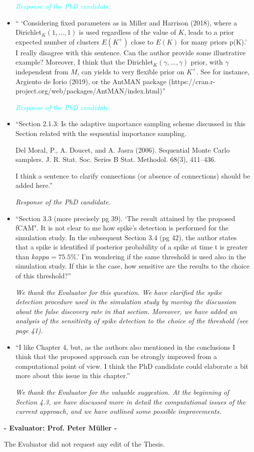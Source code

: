 \documentclass[11pt]{letter}
\begin{document}
\begin{itemize}
{\em 
	\textcolor{cyan}{Response of the PhD candidate.}
}
\vskip3mm

%
\item `` `Considering fixed parameters as in Miller and Harrison (2018), where a Dirichlet$_K(1,\dots, 1)$ is used regardless of the value of $K$, leads to a prior expected number of clusters $E(K^+)$ close to $E(K)$ for many priors p(K).'\\
I really disagree with this sentence. Can the author provide some illustrative example? Moreover, I think that the Dirichlet$_K(\gamma,\dots, \gamma)$ prior, with $\gamma$ independent from $M$, can yields to very flexible prior on $K^+$. See for instance, Argiento de Iorio (2019), or the AntMAN package (https://cran.r-
project.org/web/packages/AntMAN/index.html)''\vskip1mm

{\em 
	\textcolor{cyan}{Response of the PhD candidate.}
}
\vskip3mm

%
\item ``Section 2.1.3:
Is the adaptive importance sampling scheme discussed in this Section related with the sequential importance
sampling.

Del Moral, P., A. Doucet, and A. Jasra (2006). Sequential Monte Carlo samplers. J. R. Stat. Soc. Series B Stat. Methodol. 68(3), 411–436.

I think a sentence to clarify connections (or absence of connections) should be added here.''\vskip1mm

{\em 
	Response of the PhD candidate.
}
\vskip3mm

%
\item ``Section 3.3 (more precisely pg 39). `The result attained by the proposed fCAM".
It is not clear to me how spike's detection is performed for the simulation study. In the subsequent Section 3.4 (pg 42), the author states that a spike is identified if posterior probability of a spike at time t is greater than $kappa=75.5\%$.'
I'm wondering if the same threshold is used also in the simulation study. If this is the case, how sensitive are the results to the choice of this threshold?''\vskip1mm

{\em 
	We thank the Evaluator for this question. We have clarified the spike detection procedure used in the simulation study by moving the discussion about the false discovery rate in that section. Moreover, we have added an analysis of the sensitivity of spike detection to the choice of the threshold (see page 41).
}
\vskip3mm

%
\item ``I like Chapter 4, but, as the authors also mentioned in the conclusions I think that the proposed approach can be strongly improved from a computational point of view. I think the PhD candidate could elaborate a bit more about this issue in this chapter.''\vskip1mm

{\em 
	We thank the Evaluator for the valuable suggestion. At the beginning of Section 4.3, we have discussed more in detail the computational issues of the current approach, and we have outlined some possible improvements.
}
\vskip3mm



\end{itemize}
\vskip10mm
\begin{center}
{\large\bf - Evaluator: Prof. Peter M\"uller -}
\end{center}

The Evaluator did not request any edit of the Thesis.

%
\end{document}
